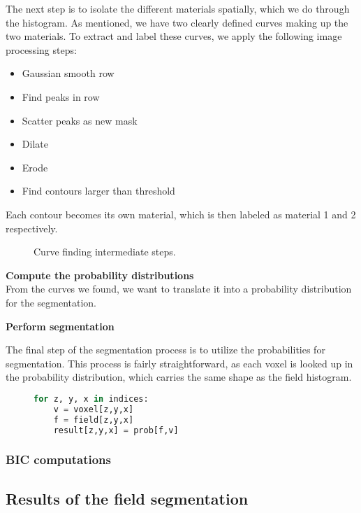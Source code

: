 The next step is to isolate the different materials spatially, which we do through the histogram.
As mentioned, we have two clearly defined curves making up the two materials.
To extract and label these curves, we apply the following image processing steps:
\begin{itemize}
    \item Gaussian smooth row
    \item Find peaks in row
    \item Scatter peaks as new mask
    \item Dilate
    \item Erode
    \item Find contours larger than threshold
\end{itemize}
Each contour becomes its own material, which is then labeled as material 1 and 2 respectively.

\begin{figure}
    \caption{Curve finding intermediate steps.}
    \label{fig:curves}
\end{figure}

\vspace{\baselineskip}
\noindent\textbf{Compute the probability distributions} \\

From the curves we found, we want to translate it into a probability distribution for the segmentation.

\vspace{\baselineskip}
\noindent\textbf{Perform segmentation}

The final step of the segmentation process is to utilize the probabilities for segmentation.
This process is fairly straightforward, as each voxel is looked up in the probability distribution, which carries the same shape as the field histogram.

\begin{figure}
    \begin{lstlisting}[language=Python,caption=Python-like pseudo code for the final segmentation.,label=lis:segmentation]
for z, y, x in indices:
    v = voxel[z,y,x]
    f = field[z,y,x]
    result[z,y,x] = prob[f,v]
    \end{lstlisting}
\end{figure}

\subsubsection{BIC computations}


\subsection{Results of the field segmentation}

